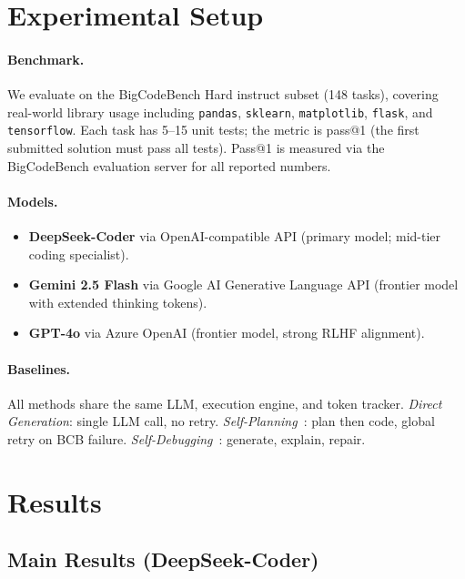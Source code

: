 \documentclass[11pt,twocolumn]{article}
\begin{document}
\section{Experimental Setup}

\paragraph{Benchmark.}
We evaluate on the BigCodeBench Hard instruct subset (148 tasks), covering
real-world library usage including \texttt{pandas}, \texttt{sklearn},
\texttt{matplotlib}, \texttt{flask}, and \texttt{tensorflow}.
Each task has 5--15 unit tests; the metric is pass@1 (the first submitted
solution must pass all tests). Pass@1 is measured via the BigCodeBench
evaluation server for all reported numbers.

\paragraph{Models.}
\begin{itemize}[leftmargin=1.2em, itemsep=1pt]
  \item \textbf{DeepSeek-Coder} via OpenAI-compatible API (primary model;
        mid-tier coding specialist).
  \item \textbf{Gemini 2.5 Flash} via Google AI Generative Language API
        (frontier model with extended thinking tokens).
  \item \textbf{GPT-4o} via Azure OpenAI (frontier model, strong RLHF
        alignment).
\end{itemize}

\paragraph{Baselines.}
All methods share the same LLM, execution engine, and token tracker.
\emph{Direct Generation}: single LLM call, no retry.
\emph{Self-Planning}~\cite{jiang2024selfplanning}: plan then code, global
retry on BCB failure.
\emph{Self-Debugging}~\cite{chen2024selfdebugging}: generate, explain, repair.

\section{Results}

\subsection{Main Results (DeepSeek-Coder)}
\end{document}
